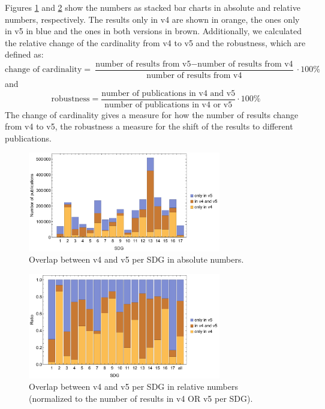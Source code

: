 \documentclass{article}
\begin{document}
Figures \ref{overlapv4vsv5absolute} and \ref{overlapv4vsv5relative} show the numbers as stacked bar charts in absolute and relative numbers, respectively. The results only in v4 are shown in orange, the ones only in v5 in blue and the ones in both versions in brown.
Additionally, we calculated the relative change of the cardinality from v4 to v5 and the robustness, which are defined as:
\begin{equation*}
    \text{change of cardinality} = \frac{\text{number of results from v5}-\text{number of results from v4}}{\text{number of results from v4}}\cdot100\%
\end{equation*}
and
\begin{equation*}
    \text{robustness} = \frac{\text{number of publications in v4 and v5}}{\text{number of publications in v4 or v5}}\cdot100\%
\end{equation*}
The change of cardinality gives a measure for how the number of results change from v4 to v5, the robustness a measure for the shift of the results to different publications.
\begin{figure}[H]
	\centering
  \includegraphics[width=0.75\textwidth]{figures/overlapv4vsv5barchartabsolute.pdf}
	\caption{Overlap between v4 and v5 per SDG in absolute numbers.}
	\label{overlapv4vsv5absolute}
\end{figure}
\begin{figure}[H]
	\centering
  \includegraphics[width=0.75\textwidth]{figures/overlapv4vsv5barchartrelative.pdf}
	\caption{Overlap between v4 and v5 per SDG in relative numbers (normalized to the number of results in v4 OR v5 per SDG).}
	\label{overlapv4vsv5relative}
\end{figure}
\end{document}
